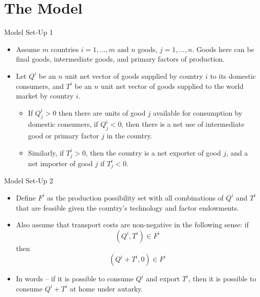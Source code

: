 \documentclass[aspectratio=169]{beamer}
\begin{document}

\section{The Model}
\begin{frame}{Model Set-Up 1}

\begin{itemize}
    \item<1-> Assume $ m $ countries $ i=1,...,m $  and $ n $ goods, $ j=1,...,n $.  Goods here can be final goods, intermediate goods, and primary factors of production.
    \item<2-> Let $ Q^i $ be an $ n $ unit net vector of goods supplied by country $ i $ to its domestic consumers, and $ T^i $ be an $ n $ unit net vector of goods supplied to the world market by country $ i $.
    \begin{itemize}
        \item<3-> If $ Q_{j}^{i} > 0 $ then there are units of good $ j $ available for consumption by domestic consumers, if $ Q_{j}^{i} < 0 $, then there is a net use of intermediate good or primary factor $ j $ in the country.
        \item<4-> Similarly, if $ T_{j}^{i} > 0 $, then the country is a net exporter of good $ j $, and a net importer of good $ j $ if $ T_{j}^{i} < 0 $. 
    \end{itemize}
\end{itemize}

\end{frame}


\begin{frame}{Model Set-Up 2}

\begin{itemize}
    \item<1-> Define $ F^{i} $ as the production possibility set with all combinations of $ Q ^{i} $ and $ T^{i} $ that are feasible given the country’s technology and factor endowments.
    \item<2-> Also assume that transport costs are non-negative in the following sense: if
    \begin{equation}
        \left( Q^{i}, T^{i} \right) \in F^{i}
        \label{eq:autarkyfeasibility1}
    \end{equation}
    then
    \begin{equation}
        \left( Q^{i} + T^{i}, 0 \right) \in F^{i}
        \label{eq:autarkyfeasibility2}
    \end{equation}
    \item<3-> In words -- if it is possible to consume $ Q^i $ and export $ T^i $, then it is possible to consume $ Q^{i} + T^{i} $ at home under autarky.
\end{itemize}

\end{frame}
\end{document}
